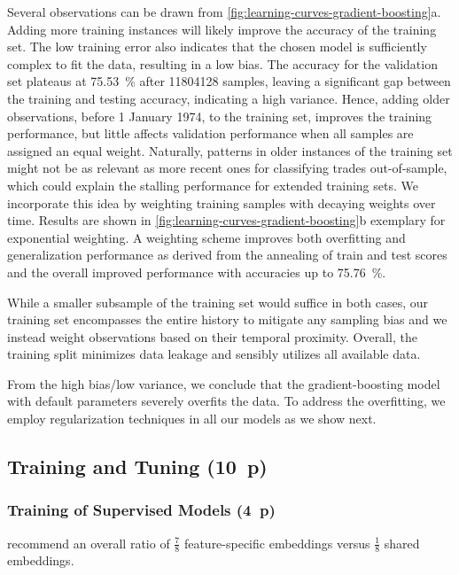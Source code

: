 Several observations can be drawn from \cref{fig:learning-curves-gradient-boosting}a. Adding more training instances will likely improve the accuracy of the training set. The low training error also indicates that the chosen model is sufficiently complex to fit the data, resulting in a low bias. The accuracy for the validation set plateaus at \SI{75.53}{\percent} after \num{11804128} samples, leaving a significant gap between the training and testing accuracy, indicating a high variance. Hence, adding older observations, before 1 January 1974, to the training set, improves the training performance, but little affects validation performance when all samples are assigned an equal weight. Naturally, patterns in older instances of the training set might not be as relevant as more recent ones for classifying trades out-of-sample, which could explain the stalling performance for extended training sets. We incorporate this idea by weighting training samples with decaying weights over time. Results are shown in \cref{fig:learning-curves-gradient-boosting}b exemplary for exponential weighting. A weighting scheme improves both overfitting and generalization performance as derived from the annealing of train and test scores and the overall improved performance with accuracies up to \SI{75.76}{\percent}.

While a smaller subsample of the training set would suffice in both cases, our training set encompasses the entire history to mitigate any sampling bias and we instead weight observations based on their temporal proximity. Overall, the training split minimizes data leakage and sensibly utilizes all available data.

From the high bias/low variance, we conclude that the gradient-boosting model with default parameters severely overfits the data. To address the overfitting, we employ regularization techniques in all our models as we show next.

\subsection{Training and Tuning (10~p)}\label{sec:training-and-tuning}

\subsubsection{Training of Supervised
    Models (4~p)}\label{sec:training-of-supervised-models}


\textcite[][12]{huangTabTransformerTabularData2020} recommend an overall ratio of $\tfrac{7}{8}$ feature-specific embeddings versus $\tfrac{1}{8}$ shared embeddings.

